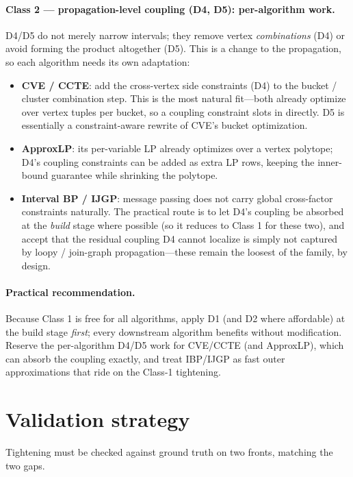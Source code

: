 \documentclass[11pt]{article}
\begin{document}
\paragraph{Class 2 --- propagation-level coupling (D4, D5): per-algorithm work.}
D4/D5 do not merely narrow intervals; they remove vertex \emph{combinations} (D4) or avoid
forming the product altogether (D5). This is a change to the propagation, so each algorithm
needs its own adaptation:
\begin{itemize}
  \item \textbf{CVE / CCTE}: add the cross-vertex side constraints (D4) to the bucket /
    cluster combination step. This is the most natural fit---both already optimize over
    vertex tuples per bucket, so a coupling constraint slots in directly. D5 is essentially
    a constraint-aware rewrite of CVE's bucket optimization.
  \item \textbf{ApproxLP}: its per-variable LP already optimizes over a vertex polytope;
    D4's coupling constraints can be added as extra LP rows, keeping the inner-bound
    guarantee while shrinking the polytope.
  \item \textbf{Interval BP / IJGP}: message passing does not carry global cross-factor
    constraints naturally. The practical route is to let D4's coupling be absorbed at the
    \emph{build} stage where possible (so it reduces to Class 1 for these two), and accept
    that the residual coupling D4 cannot localize is simply not captured by loopy / join-graph
    propagation---these remain the loosest of the family, by design.
\end{itemize}

\paragraph{Practical recommendation.}
Because Class 1 is free for all algorithms, apply D1 (and D2 where affordable) at the build
stage \emph{first}; every downstream algorithm benefits without modification. Reserve the
per-algorithm D4/D5 work for CVE/CCTE (and ApproxLP), which can absorb the coupling exactly,
and treat IBP/IJGP as fast outer approximations that ride on the Class-1 tightening.

\section{Validation strategy}\label{sec:validation}

Tightening must be checked against ground truth on two fronts, matching the two gaps.
\end{document}
